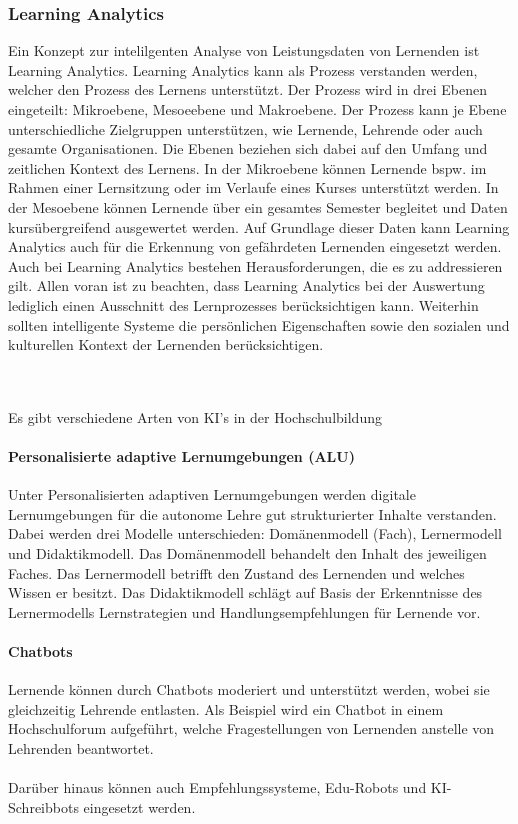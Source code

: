 \subsubsection*{Learning Analytics}
Ein Konzept zur intelilgenten Analyse von Leistungsdaten von Lernenden ist Learning Analytics.
Learning Analytics kann als Prozess verstanden werden, welcher den Prozess des Lernens unterstützt.
Der Prozess wird in drei Ebenen eingeteilt: Mikroebene, Mesoeebene und Makroebene.
Der Prozess kann je Ebene unterschiedliche Zielgruppen unterstützen, wie Lernende, Lehrende oder auch gesamte Organisationen.
Die Ebenen beziehen sich dabei auf den Umfang und zeitlichen Kontext des Lernens.
In der Mikroebene können Lernende bspw. im Rahmen einer Lernsitzung oder im Verlaufe eines Kurses unterstützt werden.
In der Mesoebene können Lernende über ein gesamtes Semester begleitet und Daten kursübergreifend ausgewertet werden.
Auf Grundlage dieser Daten kann Learning Analytics auch für die Erkennung von gefährdeten Lernenden eingesetzt werden.\cite*[S. 14ff]{Witt.2020}
 \\ \noindent
Auch bei Learning Analytics bestehen Herausforderungen, die es zu addressieren gilt.
Allen voran ist zu beachten, dass Learning Analytics bei der Auswertung lediglich einen Ausschnitt des Lernprozesses berücksichtigen kann.
Weiterhin sollten intelligente Systeme die persönlichen Eigenschaften sowie den sozialen und kulturellen Kontext der Lernenden berücksichtigen. \cite*[S. 16]{Witt.2020}

\\ \noindent
\\ \noindent
Es gibt verschiedene Arten von KI's in der Hochschulbildung
\paragraph*{Personalisierte adaptive Lernumgebungen (ALU)}
Unter Personalisierten adaptiven Lernumgebungen werden digitale Lernumgebungen für die autonome Lehre gut strukturierter Inhalte verstanden.
Dabei werden drei Modelle unterschieden: Domänenmodell (Fach), Lernermodell und Didaktikmodell.
Das Domänenmodell behandelt den Inhalt des jeweiligen Faches.
Das Lernermodell betrifft den Zustand des Lernenden und welches Wissen er besitzt.
Das Didaktikmodell schlägt auf Basis der Erkenntnisse des Lernermodells Lernstrategien und Handlungsempfehlungen für Lernende vor. \cite*[S. 17f]{Witt.2020}
\paragraph*{Chatbots}
Lernende können durch Chatbots moderiert und unterstützt werden, wobei sie gleichzeitig Lehrende entlasten.
Als Beispiel wird ein Chatbot in einem Hochschulforum aufgeführt, welche Fragestellungen von Lernenden anstelle von Lehrenden beantwortet. \cite*[S. 18ff]{Witt.2020}
\\ \\ \noindent
Darüber hinaus können auch Empfehlungssysteme, Edu-Robots und KI-Schreibbots eingesetzt werden. \cite*[S. 18-21]{Witt.2020}

